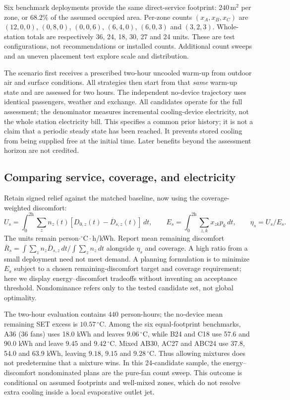 Six benchmark deployments provide the same direct-service footprint: $240\,\mathrm{m^2}$ per zone, or $68.2\%$ of the assumed occupied area. Per-zone counts $(x_A,x_B,x_C)$ are $(12,0,0)$, $(0,8,0)$, $(0,0,6)$, $(6,4,0)$, $(6,0,3)$ and $(3,2,3)$. Whole-station totals are respectively 36, 24, 18, 30, 27 and 24 units. These are test configurations, not recommendations or installed counts. Additional count sweeps and an uneven placement test explore scale and distribution.

The scenario first receives a prescribed two-hour uncooled warm-up from outdoor air and surface conditions. All strategies then start from that \emph{same} warm-up state and are assessed for two hours. The independent no-device trajectory uses identical passengers, weather and exchange. All candidates operate for the full assessment; the denominator measures incremental cooling-device electricity, not the whole station electricity bill. This specifies a common prior history; it is not a claim that a periodic steady state has been reached. It prevents stored cooling from being supplied free at the initial time. Later benefits beyond the assessment horizon are not credited.

\subsection{Comparing service, coverage, and electricity}

Retain signed relief against the matched baseline, now using the coverage-weighted discomfort:
\begin{equation}
 U_s=\int_0^{2\mathrm h}\sum_z n_z(t)[D_{0,z}(t)-\overline D_{s,z}(t)]\,dt,
 \qquad E_s=\int_0^{2\mathrm h}\sum_{z,k}x_{zk}p_k\,dt,
 \qquad \eta_s=U_s/E_s.
\label{eq:rail-efficiency}
\end{equation}
The units remain person$\cdot{}^{\circ}\mathrm C\cdot$h/kWh. Report mean remaining discomfort $\overline R_s=\int\sum_z n_z\overline D_{s,z}\,dt/\int\sum_z n_z\,dt$ alongside $\eta_s$ and coverage. A high ratio from a small deployment need not meet demand. A planning formulation is to minimize $E_s$ subject to a chosen remaining-discomfort target and coverage requirement; here we display energy--discomfort tradeoffs without inventing an acceptance threshold. Nondominance refers only to the tested candidate set, not global optimality.

The two-hour evaluation contains $440$ person-hours; the no-device mean remaining SET excess is $10.57\,^{\circ}\mathrm C$. Among the six equal-footprint benchmarks, A36 (36 fans) uses 18.0 kWh and leaves $9.06\,^{\circ}\mathrm C$, while B24 and C18 use 57.6 and 90.0 kWh and leave $9.45$ and $9.42\,^{\circ}\mathrm C$. Mixed AB30, AC27 and ABC24 use 37.8, 54.0 and 63.9 kWh, leaving $9.18$, $9.15$ and $9.28\,^{\circ}\mathrm C$. Thus allowing mixtures does not predetermine that a mixture wins. In this 24-candidate sample, the energy--discomfort nondominated plans are the pure-fan count sweep. This outcome is conditional on assumed footprints and well-mixed zones, which do not resolve extra cooling inside a local evaporative outlet jet.

